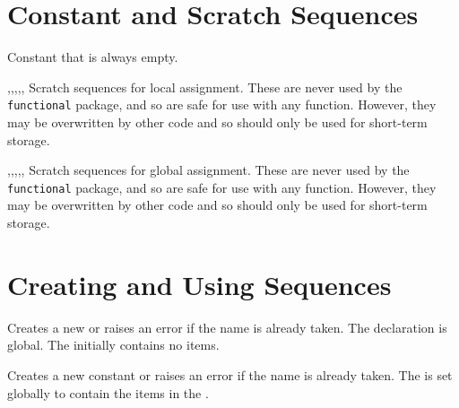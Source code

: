 \documentclass[oneside]{book}
\begin{document}
\section{Constant and Scratch Sequences}

\begin{variable}{\cEmptySeq}
Constant that is always empty.
\end{variable}

\begin{variable}{\lTmpaSeq,\lTmpbSeq,\lTmpcSeq,\lTmpiSeq,\lTmpjSeq,\lTmpkSeq}
Scratch sequences for local assignment. These are never used by
the \verb!functional! package, and so are safe for use with any
function. However, they may be overwritten by other
code and so should only be used for short-term storage.
\end{variable}

\begin{variable}{\gTmpaSeq,\gTmpbSeq,\gTmpcSeq,\gTmpiSeq,\gTmpjSeq,\gTmpkSeq}
Scratch sequences for global assignment. These are never used by
the \verb!functional! package, and so are safe for use with any
function. However, they may be overwritten by other
code and so should only be used for short-term storage.
\end{variable}

\section{Creating and Using Sequences}

\begin{function}{\SeqNew}
\begin{syntax}
 
\end{syntax}
Creates a new  or raises an error if the name is
already taken. The declaration is global. The 
initially contains no items.
\begin{codehigh}
\SeqNew \lFooSomeSeq
\end{codehigh}
\end{function}

\begin{function}{\SeqConstFromClist}
\begin{syntax}
  
\end{syntax}
Creates a new constant  or raises an error if the name
is already taken. The  is set globally to contain the
items in the .
\begin{codehigh}
\SeqConstFromClist {}
\end{codehigh}
\end{function}
\end{document}
